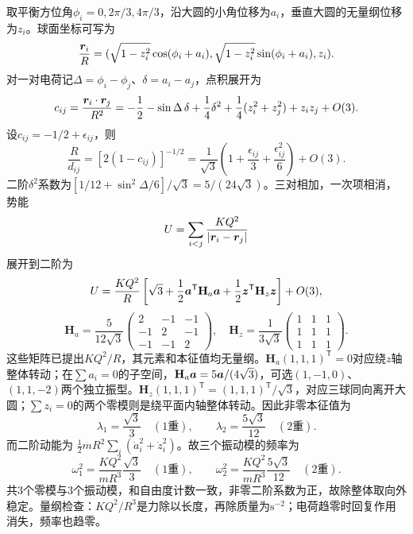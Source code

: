 \begin{xesolution}
取平衡方位角$\phi_i=0,2\pi/3,4\pi/3$，沿大圆的小角位移为$a_i$，垂直大圆的无量纲位移为$z_i$。球面坐标可写为
\[
 \frac{\bm{r}_i}{R}=(\sqrt{1-z_i^2}\cos(\phi_i+a_i),
 \sqrt{1-z_i^2}\sin(\phi_i+a_i),z_i).
\]
对一对电荷记$\Delta=\phi_i-\phi_j$、$\delta=a_i-a_j$，点积展开为
\[
 c_{ij}=\frac{\bm{r}_i\cdot\bm{r}_j}{R^2}
 =-\frac12-\sin\Delta\,\delta+\frac14\delta^2
 +\frac14(z_i^2+z_j^2)+z_iz_j+O(3).
\]
设$c_{ij}=-1/2+\epsilon_{ij}$，则
\[
 \frac R{d_{ij}}=[2(1-c_{ij})]^{-1/2}
 =\frac1{\sqrt3}\left(1+\frac{\epsilon_{ij}}3+\frac{\epsilon_{ij}^2}{6}\right)+O(3).
\]
二阶$\delta^2$系数为$[1/12+\sin^2\Delta/6]/\sqrt3=5/(24\sqrt3)$。三对相加，一次项相消，势能
\[
 U=\sum_{i<j}\frac{KQ^2}{|\bm{r}_i-\bm{r}_j|}
\]
展开到二阶为
\[
 U=\frac{KQ^2}{R}\left[\sqrt3+\frac12\bm{a}^{\mathsf T}\mathbf H_a\bm{a}
 +\frac12\bm{z}^{\mathsf T}\mathbf H_z\bm{z}\right]+O(3),
\]
\[
 \mathbf H_a=\frac5{12\sqrt3}\begin{pmatrix}2&-1&-1\\-1&2&-1\\-1&-1&2\end{pmatrix},\quad
 \mathbf H_z=\frac1{3\sqrt3}\begin{pmatrix}1&1&1\\1&1&1\\1&1&1\end{pmatrix}.
\]
这些矩阵已提出$KQ^2/R$，其元素和本征值均无量纲。$\mathbf H_a(1,1,1)^{\mathsf T}=0$对应绕$z$轴整体转动；在$\sum a_i=0$的子空间，$\mathbf H_a\bm{a}=5\bm{a}/(4\sqrt3)$，可选$(1,-1,0)$、$(1,1,-2)$两个独立振型。$\mathbf H_z(1,1,1)^{\mathsf T}=(1,1,1)^{\mathsf T}/\sqrt3$，对应三球同向离开大圆；$\sum z_i=0$的两个零模则是绕平面内轴整体转动。因此非零本征值为
\[
 \lambda_1=\frac{\sqrt3}{3}\quad(1\text{重}),\qquad
 \lambda_2=\frac{5\sqrt3}{12}\quad(2\text{重}).
\]
而二阶动能为 $\tfrac12mR^2\sum_i(\dot a_i^2+\dot z_i^2)$。故三个振动模的频率为
\[
 \boxed{\omega_1^2=\frac{KQ^2}{mR^3}\frac{\sqrt3}{3}}\quad(1\text{重}),
 \qquad
 \boxed{\omega_2^2=\frac{KQ^2}{mR^3}\frac{5\sqrt3}{12}}\quad(2\text{重}).
\]
共3个零模与3个振动模，和自由度计数一致，非零二阶系数为正，故除整体取向外稳定。量纲检查：$KQ^2/R^3$是力除以长度，再除质量为$\mathrm{s^{-2}}$；电荷趋零时回复作用消失，频率也趋零。
\end{xesolution}

